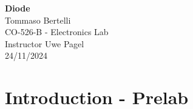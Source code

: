 \documentclass{article}
\begin{document}
	
	\mbox{}
	\vspace{10cm}
	\begin{center}
		\textbf{\Huge{Diode}}\\
		\bigskip
		\Large{Tommaso Bertelli}\\
		\bigskip
		\Large{CO-526-B - Electronics Lab}\\
		\bigskip
		\Large{Instructor Uwe Pagel}\\
		\bigskip
		\Large{24/11/2024}\\
	\end{center}
	\pagebreak
	
	\section{Introduction - Prelab}
\end{document}
